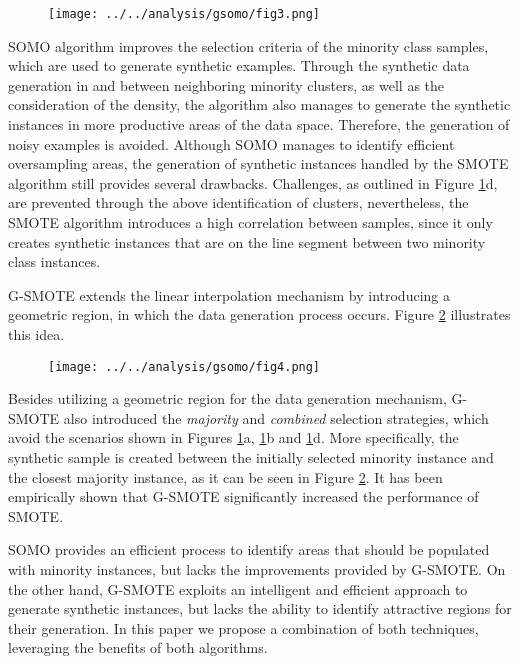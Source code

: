 \documentclass[parskip=full]{scrartcl}
\begin{document}
\begin{figure}[H]
	\centering
	\texttt{[image: ../../analysis/gsomo/fig3.png]}
	\label{fig:Douzas}
\end{figure}

SOMO algorithm improves the selection criteria of the minority class samples, which are used to generate synthetic examples. Through the synthetic data generation in and between neighboring minority clusters, as well as the consideration of the density, the algorithm also manages to generate the synthetic instances in more productive areas of the data space. Therefore, the generation of noisy examples is avoided. Although SOMO manages to identify efficient oversampling areas, the generation of synthetic instances handled by the SMOTE algorithm still provides several drawbacks. Challenges, as outlined in Figure \ref{fig:Douzas}d, are prevented through the above identification of clusters, nevertheless, the SMOTE algorithm introduces a high correlation between samples, since it only creates synthetic instances that are on the line segment between two minority class instances.

G-SMOTE extends the linear interpolation mechanism by introducing a geometric region, in which the data generation process occurs. Figure \ref{fig:GSMOTE} illustrates this idea.

\begin{figure}[H]
	\centering
	\texttt{[image: ../../analysis/gsomo/fig4.png]}
	\label{fig:GSMOTE}
\end{figure}

Besides utilizing a geometric region for the data generation mechanism, G-SMOTE also introduced the \textit{majority} and \textit{combined} selection strategies, which avoid the scenarios shown in Figures \ref{fig:Douzas}a, \ref{fig:Douzas}b and \ref{fig:Douzas}d. More specifically, the synthetic sample is created between the initially selected minority instance and the closest majority instance, as it can be seen in Figure \ref{fig:GSMOTE}. It has been empirically shown that G-SMOTE \cite{Douzas2019} significantly increased the performance of SMOTE.

SOMO provides an efficient process to identify areas that should be populated
with minority instances, but lacks the improvements provided by G-SMOTE. On the
other hand, G-SMOTE exploits an intelligent and efficient approach to generate
synthetic instances, but lacks the ability to identify attractive regions for their generation. In this paper we propose a combination of both techniques,
leveraging the benefits of both algorithms.
\end{document}
